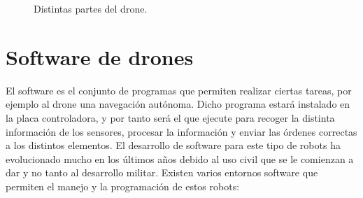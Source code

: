 \begin{figure}[H]
 \centering
 \caption{Distintas partes del drone.}
 \label{f:Test 1}
\end{figure} 


\section{Software de drones}
\hspace{1 cm} El software es el conjunto de programas que permiten realizar ciertas tareas, por ejemplo al drone una navegaci\'on aut\'onoma. Dicho programa estar\'a instalado en la placa controladora, y por tanto ser\'a el que ejecute para recoger la distinta informaci\'on de los sensores, procesar la informaci\'on y enviar las \'ordenes correctas a los distintos elementos. El desarrollo de software para este tipo de robots ha evolucionado mucho en los \'ultimos años debido al uso civil que se le comienzan a dar y no tanto al desarrollo militar. Existen varios entornos software que permiten el manejo y la programaci\'on de estos robots:

